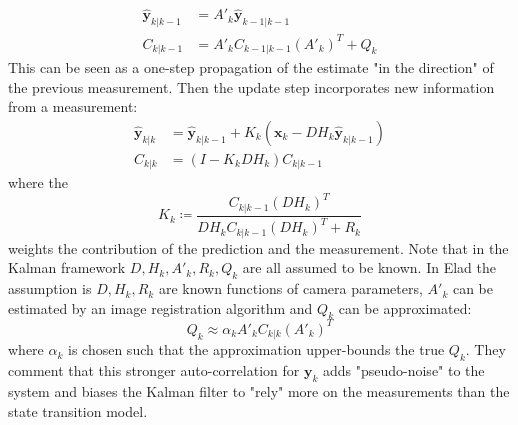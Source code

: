 \begin{align}
	\hat{\bm{y}}_{k|k-1} & = A'_k \hat{\bm{y}}_{k-1|k-1}     \\
	C_{k|k-1}            & = A'_k C_{k-1|k-1} (A'_k)^T + Q_k
\end{align}
This can be seen as a one-step propagation of the estimate "in the direction" of the previous measurement.
%
Then the update step incorporates new information from a measurement:
\begin{align}
	\hat{\bm{y}}_{k|k} & = \hat{\bm{y}}_{k|k-1} + K_k(\bm{x}_k - DH_k\hat{\bm{y}}_{k|k-1} ) \\
	C_{k|k}            & = (I - K_k DH_k)C_{k|k-1}
\end{align}
where the 
\begin{equation}
	K_k \coloneqq \frac{C_{k|k-1}(DH_k)^T}{DH_k C_{k|k-1} (DH_k)^T + R_k }
\end{equation}
weights the contribution of the prediction and the measurement.
%
Note that in the Kalman framework $D, H_k, A'_k, R_k, Q_k$ are all assumed to be known.
%
In Elad \etal\cite{elad1999} the assumption is $D, H_k, R_k$ are known functions of camera parameters, $A'_k$ can be estimated by an image registration algorithm and $Q_k$ can be approximated:
\begin{equation}
	Q_k \approx \alpha_k A'_k C_{k|k} (A'_k)^T
\end{equation}
where $\alpha_k$ is chosen such that the approximation upper-bounds the true $Q_k$.
%
They comment that this stronger auto-correlation for $\bm{y}_k$ adds "pseudo-noise" to the system and biases the Kalman filter to "rely" more on the measurements than the state transition model.
